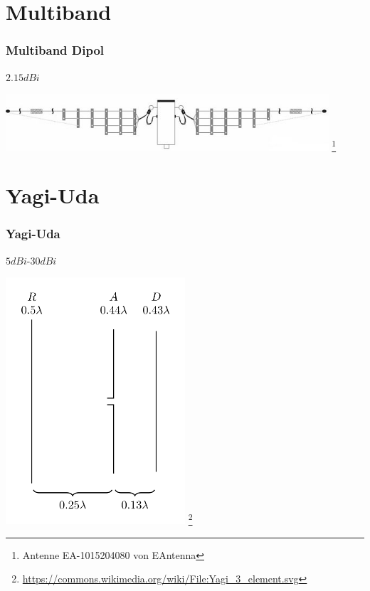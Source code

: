 \section*{Multiband}

\begin{frame}
    \frametitle{Multiband Dipol}
    $2.15dBi$
    \begin{center}
        \includegraphics[width=0.9\textwidth]{e11/Multiband.jpg}
        \footnote{\tiny Antenne EA-1015204080 von EAntenna}
	\end{center}
\end{frame}


\section*{Yagi-Uda}

\begin{frame}
    \frametitle{Yagi-Uda}
    $5dBi$-$30dBi$
    \begin{center}
        \includegraphics[width=0.5\textwidth]{e11/Yagi_3_element.png}
        \footnote{\tiny \url{https://commons.wikimedia.org/wiki/File:Yagi_3_element.svg}}
	\end{center}
\end{frame}


